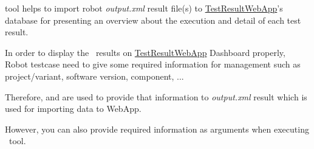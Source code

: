 



\href{https://github.com/test-fullautomation/robotframework-robotlog2db}{\pkg}
tool helps to import robot \emph{output.xml} result file(s) to
\href{https://github.com/test-fullautomation/testresultwebapp}{TestResultWebApp}'s
database for presenting an overview about the execution and detail of
each test result.

In order to display the \rfwcore\ results on
\href{https://github.com/test-fullautomation/testresultwebapp}{TestResultWebApp}
Dashboard properly, Robot testcase need to give some required
information for management such as project/variant, software version,
component, ...

Therefore,  and \rcode{[Tags]} are used to provide
that information to \emph{output.xml} result which is used for importing
data to WebApp.

However, you can also provide required information as arguments when executing
\pkg\ tool.
